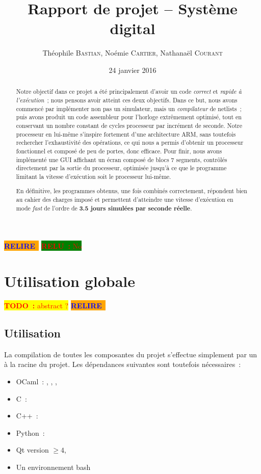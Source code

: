 \documentclass[11pt,a4paper]{article}
\author{Théophile \textsc{Bastian}, Noémie \textsc{Cartier}, Nathanaël \textsc{Courant}}
\title{Rapport de projet -- Système digital}
\date{24 janvier 2016} %
\newcommand{\todo}[1]{\colorbox{yellow}{\textcolor{red}{\textbf{TODO~:} #1}}}
\newcommand{\relire}{\colorbox{orange}{\textcolor{blue}{\textbf{RELIRE}~}}}
\newcommand{\relu}[1]{\colorbox{green}{\textcolor{red}{\textbf{RELU~:} #1}}}
\begin{document}
\maketitle

\relire
\relu{No}
\begin{abstract}
Notre objectif dans ce projet a été principalement d'avoir un code \emph{correct} et \emph{rapide à l'exécution}~; nous pensons avoir atteint ces deux objectifs. Dans ce but, nous avons commencé par implémenter non pas un simulateur, mais un \emph{compilateur} de netlists~; puis avons produit un code assembleur pour l'horloge extrêmement optimisé, tout en conservant un nombre constant de cycles processeur par incrément de seconde. Notre processeur en lui-même s'inspire fortement d'une architecture ARM, sans toutefois rechercher l'exhaustivité des opérations, ce qui nous a permis d'obtenir un processeur fonctionnel et composé de peu de portes, donc efficace. Pour finir, nous avons implémenté une GUI affichant un écran composé de blocs 7 segments, contrôlés directement par la sortie du processeur, optimisée jusqu'à ce que le programme limitant la vitesse d'exécution soit le processeur lui-même.

En définitive, les programmes obtenus, une fois combinés correctement, répondent bien au cahier des charges imposé et permettent d'atteindre une vitesse d'exécution en mode \textit{fast} de l'ordre de \textbf{3.5 jours simulées par seconde réelle}.
\end{abstract}

\setcounter{tocdepth}{2} %
\tableofcontents
\pagebreak


\section{Utilisation globale}

\todo{abstract ?}
\relire

\subsection{Utilisation}

La compilation de toutes les composantes du projet s'effectue simplement par un  à la racine du projet. Les dépendances suivantes sont toutefois nécessaires~:

\begin{itemize}
\item OCaml~: , , , 
\item C~: 
\item C++~: 
\item Python~: 
\item Qt version $\geq 4$, 
\item Un environnement bash
\end{itemize}
\end{document}
